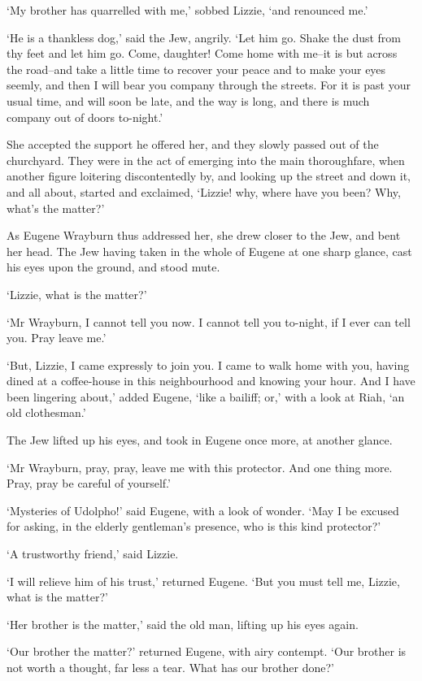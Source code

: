 ‘My brother has quarrelled with me,’ sobbed Lizzie, ‘and renounced me.’

‘He is a thankless dog,’ said the Jew, angrily. ‘Let him go. Shake the
dust from thy feet and let him go. Come, daughter! Come home with me--it
is but across the road--and take a little time to recover your peace and
to make your eyes seemly, and then I will bear you company through the
streets. For it is past your usual time, and will soon be late, and the
way is long, and there is much company out of doors to-night.’

She accepted the support he offered her, and they slowly passed out
of the churchyard. They were in the act of emerging into the main
thoroughfare, when another figure loitering discontentedly by, and
looking up the street and down it, and all about, started and exclaimed,
‘Lizzie! why, where have you been? Why, what’s the matter?’

As Eugene Wrayburn thus addressed her, she drew closer to the Jew, and
bent her head. The Jew having taken in the whole of Eugene at one sharp
glance, cast his eyes upon the ground, and stood mute.

‘Lizzie, what is the matter?’

‘Mr Wrayburn, I cannot tell you now. I cannot tell you to-night, if I
ever can tell you. Pray leave me.’

‘But, Lizzie, I came expressly to join you. I came to walk home with
you, having dined at a coffee-house in this neighbourhood and knowing
your hour. And I have been lingering about,’ added Eugene, ‘like a
bailiff; or,’ with a look at Riah, ‘an old clothesman.’

The Jew lifted up his eyes, and took in Eugene once more, at another
glance.

‘Mr Wrayburn, pray, pray, leave me with this protector. And one thing
more. Pray, pray be careful of yourself.’

‘Mysteries of Udolpho!’ said Eugene, with a look of wonder. ‘May I be
excused for asking, in the elderly gentleman’s presence, who is this
kind protector?’

‘A trustworthy friend,’ said Lizzie.

‘I will relieve him of his trust,’ returned Eugene. ‘But you must tell
me, Lizzie, what is the matter?’

‘Her brother is the matter,’ said the old man, lifting up his eyes
again.

‘Our brother the matter?’ returned Eugene, with airy contempt. ‘Our
brother is not worth a thought, far less a tear. What has our brother
done?’


